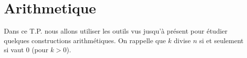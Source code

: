\chapter{Arithmetique}
\thispagestyle{empty}
\vskip -2cm

{\sf Dans ce T.P. nous allons utiliser les outils vus jusqu'à présent pour étudier quelques constructions arithmétiques. On rappelle que $k$ divise $n$ si et seulement si  vaut 0 (pour $k> 0$).
}
